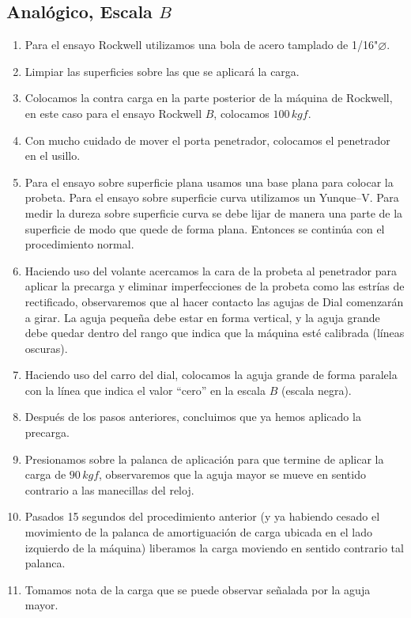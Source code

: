 \documentclass[a4paper,12pt]{report}
\begin{document}
\subsection{Analógico, Escala $B$}
\begin{enumerate}
\item Para el ensayo Rockwell utilizamos una bola de acero tamplado de 1/16"$\diameter$.
\item Limpiar las superficies sobre las que se aplicará la carga.
\item Colocamos la contra carga en la parte posterior de la máquina de Rockwell, en este caso para el ensayo Rockwell $B$, colocamos $100\,kgf$.
\item Con mucho cuidado de mover el porta penetrador, colocamos el penetrador en el usillo.
\item Para el ensayo sobre superficie plana usamos una base plana para colocar la probeta. Para el ensayo sobre superficie curva utilizamos un Yunque–V. Para medir la dureza sobre superficie curva se debe lijar de manera una parte de la superficie de modo que quede de forma plana. Entonces se continúa con el procedimiento normal.
\item Haciendo uso del volante acercamos la cara de la probeta al penetrador para aplicar la precarga y eliminar imperfecciones de la probeta como las estrías de rectificado, observaremos que al hacer contacto las agujas de Dial comenzarán a girar. La aguja pequeña debe estar en forma vertical, y la aguja grande debe quedar dentro del rango que indica que la máquina esté calibrada (líneas oscuras).
\item Haciendo uso del carro del dial, colocamos la aguja grande de forma paralela con la línea que indica el valor “cero'' en la escala $B$ (escala negra).
\item Después de los pasos anteriores, concluimos que ya hemos aplicado la precarga.
\item Presionamos sobre la palanca de aplicación para que termine de aplicar la carga de $90\,kgf$, observaremos que la aguja mayor se mueve en sentido contrario a las manecillas del reloj.
\item Pasados 15 segundos del procedimiento anterior (y ya habiendo cesado el movimiento de la palanca de amortiguación de carga ubicada en el lado izquierdo de la máquina) liberamos la carga moviendo en sentido contrario tal palanca.
\item Tomamos nota de la carga que se puede observar señalada por la aguja mayor.
\end{enumerate}
\newpage
\end{document}
